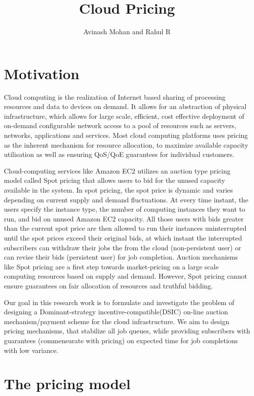 \documentclass[a4paper,english,12pt]{article}
\title{Cloud Pricing}
\author{Avinash Mohan and Rahul R}
\date{}
\begin{document}
\maketitle

\section{Motivation}
Cloud computing is the realization of Internet based sharing of processing resources and data to devices on demand. It allows for an abstraction of physical infrastructure, which allows for large scale, efficient, cost effective deployment of on-demand configurable network access to a pool of resources such as servers, networks, applications and services. Most cloud computing platforms uses pricing as the inherent mechanism for resource allocation, to maximize available capacity utilisation as well as ensuring QoS/QoE guarantees for individual customers.

 Cloud-computing services like Amazon EC2 utilizes an auction type pricing model called Spot pricing that allows users to bid for the unused capacity available in the system. In spot pricing, the spot price is dynamic and varies depending on current supply and demand fluctuations. At every time instant, the users specify the instance type, the number of computing instances they want to run, and bid on unused Amazon EC2 capacity. All those users with bids greater than the current spot price are then allowed to run their instances uninterrupted until the spot prices exceed their original bids, at which instant the interrupted subscribers can withdraw their jobs the from the cloud (non-persistent user) or can revise their bids (persistent user) for job completion. Auction mechanisms like Spot pricing are a first step towards market-pricing on a large scale computing resources based on supply and demand. However, Spot pricing cannot ensure guarantees on fair allocation of resources and truthful bidding. 

Our goal in this research work is to formulate and investigate the problem of designing a Dominant-strategy incentive-compatible(DSIC) on-line auction mechanism/payment scheme for the cloud infrastructure. We aim to design pricing mechanisms, that stabilize all job queues, while providing subscribers with guarantees (commensurate with pricing) on expected time for job completions with low variance. 

\section{The pricing model}
\end{document}
